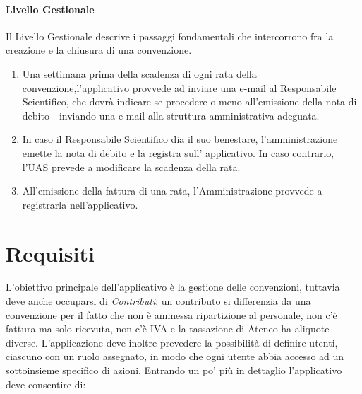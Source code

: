 \paragraph{Livello Gestionale}
Il Livello Gestionale descrive i passaggi fondamentali che intercorrono fra la creazione e la chiusura di una convenzione.\newline
\begin{enumerate}
\item Una settimana prima della scadenza di ogni rata della convenzione,l'applicativo provvede ad inviare una e-mail al Responsabile Scientifico, che dovrà indicare se procedere o meno all'emissione della nota di debito - inviando una e-mail alla struttura amministrativa adeguata.
\item In caso il Responsabile Scientifico dia il suo benestare, l'amministrazione emette la nota di debito e la registra sull' applicativo. In caso contrario, l'UAS prevede a modificare la scadenza della rata.
\item All'emissione della fattura di una rata, l'Amministrazione provvede a registrarla nell'applicativo.\newline
\end{enumerate}

\section{Requisiti}
L'obiettivo principale dell'applicativo è la gestione delle convenzioni, tuttavia deve anche occuparsi di \textsl{Contributi}: un contributo si differenzia da una convenzione per il fatto che non è ammessa ripartizione al personale, non c'è fattura ma solo ricevuta, non c'è IVA e la tassazione di Ateneo ha aliquote diverse.\newline
L'applicazione deve inoltre prevedere la possibilità di definire utenti, ciascuno con un ruolo assegnato, in modo che ogni utente abbia accesso ad un sottoinsieme specifico di azioni. Entrando un po' più in dettaglio l'applicativo deve
consentire di:

